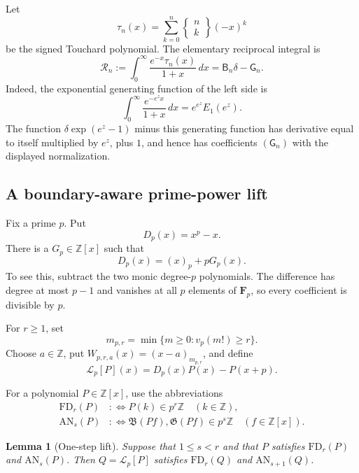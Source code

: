 \documentclass[11pt]{article}
\newtheorem{lemma}[theorem]{Lemma}
\theoremstyle{definition}
\theoremstyle{remark}
\newcommand{\Z}{\mathbb Z}
\begin{document}
Let
\begin{equation}\label{eq:signed-touchard}
 \tau_n(x)=\sum_{k=0}^n
 \left\{\begin{matrix}n\\k\end{matrix}\right\}(-x)^k
\end{equation}
be the signed Touchard polynomial.  The elementary reciprocal integral is
\begin{equation}\label{eq:touchard-remainder}
 \mathscr R_n
 :=\int_0^\infty\frac{e^{-x}\tau_n(x)}{1+x}\,dx
 =\mathsf B_n\delta-\mathsf G_n.
\end{equation}
Indeed, the exponential generating function of the left side is
\[
 \int_0^\infty\frac{e^{-e^z x}}{1+x}\,dx
 =e^{e^z}E_1(e^z).
\]
The function \(\delta\exp(e^z-1)\) minus this generating function has
derivative equal to itself multiplied by \(e^z\), plus \(1\), and hence has coefficients
\((\mathsf G_n)\) with the displayed normalization.

\subsection{A boundary-aware prime-power lift}

Fix a prime \(p\).  Put
\[
 D_p(x)=x^p-x.
\]
There is a \(G_p\in\Z[x]\) such that
\begin{equation}\label{eq:dp-falling}
 D_p(x)=(x)_p+pG_p(x).
\end{equation}
To see this, subtract the two monic degree-\(p\) polynomials.  The difference
has degree at most \(p-1\) and vanishes at all \(p\) elements of
\(\mathbf F_p\), so every coefficient is divisible by \(p\).

For \(r\geq1\), set
\[
 m_{p,r}=\min\{m\geq0:v_p(m!)\geq r\}.
\]
Choose \(a\in\Z\), put \(W_{p,r,a}(x)=(x-a)_{m_{p,r}}\), and define
\begin{equation}\label{eq:touchard-lift-operator}
 \mathcal L_p[P](x)=D_p(x)P(x)-P(x+p).
\end{equation}

For a polynomial \(P\in\Z[x]\), use the abbreviations
\begin{align*}
 \mathrm{FD}_r(P)&:\Longleftrightarrow
      P(k)\in p^r\Z\quad(k\in\Z),\\
 \mathrm{AN}_s(P)&:\Longleftrightarrow
      \mathfrak B(Pf),\mathfrak G(Pf)\in p^s\Z
      \quad(f\in\Z[x]).
\end{align*}

\begin{lemma}[One-step lift]
\label{lem:touchard-one-step}
Suppose that \(1\leq s<r\) and that \(P\) satisfies
\(\mathrm{FD}_r(P)\) and \(\mathrm{AN}_s(P)\).  Then
\(Q=\mathcal L_p[P]\) satisfies
\(\mathrm{FD}_r(Q)\) and \(\mathrm{AN}_{s+1}(Q)\).
\end{lemma}
\end{document}

